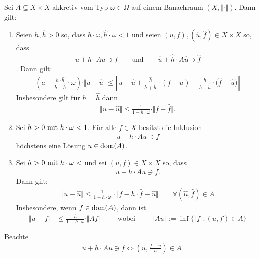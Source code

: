 \begin{theorem}\enter
Sei $A\subseteq X\times X$ akkretiv vom Typ $\omega\in\Omega$ auf einem Banachraum $(X,\Vert\cdot\Vert)$. Dann gilt:
\begin{enumerate}[label=(\alph*)]
\item Seien $h,\hat{h}>0$ so, dass $h\cdot\omega,\hat{h}\cdot\omega<1$ und seien $(u,f),(\hat{u},\hat{f})\in X\times X$ so, dass 
\begin{align*}
u+h\cdot Au\ni f\qquad\text{und}\qquad\hat{u}+\hat{h}\cdot A\hat{u}\ni\hat{f}
\end{align*}.
Dann gilt:
\begin{align*}
\left(a-\frac{h\cdot\hat{h}}{h+\hat{h}}\cdot\omega\right)\cdot\Vert u-\hat{u}\Vert
\leq
\left\Vert u-\hat{u}+\frac{\hat{h}}{h+\hat{h}}\cdot(f-u)-\frac{h}{h+\hat{h}}\cdot\big(\hat{f}-\hat{u}\big)\right\Vert
\end{align*}
Insbesondere gilt für $h=\hat{h}$ dann
\begin{align*}
\Vert u-\hat{u}\Vert
\leq
\frac{1}{1-h\cdot\omega}\cdot\Vert f-\hat{f}\Vert.
\end{align*}
\item Sei $h>0\mit h\cdot \omega<1$. Für alle $f\in X$ besitzt die Inklusion
\begin{align*}
u+h\cdot Au\ni f
\end{align*}
höchstens eine Lösung $u\in\dom(A)$.
\item Sei $h>0\mit h\cdot\omega<$ und sei $(u,f)\in X\times X$ so, dass 
\begin{align*}
u+h\cdot Au\ni f.
\end{align*}
Dann gilt:
\begin{align*}
\Vert u-\hat{u}\Vert
\leq
\frac{1}{1-h\cdot\omega}\cdot\big\Vert f-h\cdot\hat{f}-\hat{u}\big\Vert
\qquad
\forall(\hat{u},\hat{f})\in A
\end{align*}
Insbesondere, wenn $f\in\dom(A)$, dann ist
\begin{align*}
\Vert u-f\Vert
&\leq
\frac{h}{1-h\cdot\omega}\cdot\Vert Af\Vert
\qquad
\text{ wobei }
\qquad
\Vert Au\Vert:=\inf\big\lbrace\Vert f\Vert:(u,f)\in A\big\rbrace
\end{align*}
\end{enumerate}
\end{theorem}

\begin{bemerkung}
Beachte
\begin{align*}
u+h\cdot Au\ni f\Longleftrightarrow\left(u,\frac{f-u}{h}\right)\in A
\end{align*}
\end{bemerkung}

